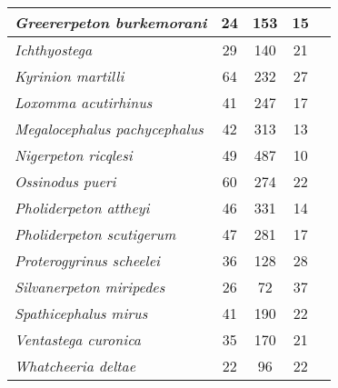 \begin{tabular}{|L{4.5cm}|c|c|c|L{4.5cm}|}
\textit{Greererpeton burkemorani}&24&153&15&\citet{Bolt10a}\\\hline
\textit{Ichthyostega}&29&140&21&\citet{Clac02b,Porr15a}\\\hline
\textit{Kyrinion martilli}&64&232&27&\citet{Beau77a}\\\hline
\textit{Loxomma acutirhinus}&41&247&17&\citet{Beau98a}\\\hline
\textit{Megalocephalus pachycephalus}&42&313&13&\citet{Clac03a}\\\hline
\textit{Nigerpeton ricqlesi}&49&487&10&\citet{Holm98a}\\\hline
\textit{Ossinodus pueri}&60&274&22&\citet{Lomb95a}\\\hline
\textit{Pholiderpeton attheyi}&46&331&14&\citet{Rome42a}\\\hline
\textit{Pholiderpeton scutigerum}&47&281&17&\citet{Holm84a}\\\hline
\textit{Proterogyrinus scheelei}&36&128&28&\citet{Smit85a}\\\hline
\textit{Silvanerpeton miripedes}&26&72&37&\citet{Sido05a}\\\hline
\textit{Spathicephalus mirus}&41&190&22&\citet{Clac98a}\\\hline
\textit{Ventastega curonica}&35&170&21&\citet{Source}\\\hline
\textit{Whatcheeria deltae}&22&96&22&\citet{Bent90a}\\\hline
\end{tabular}
